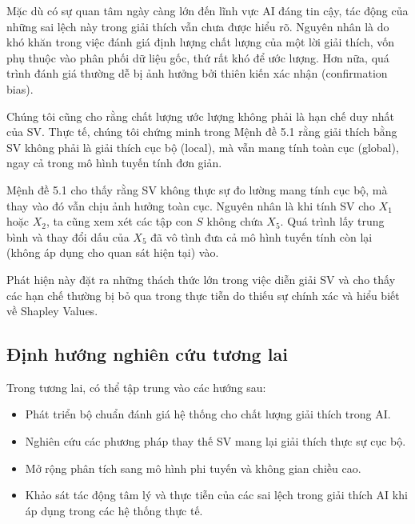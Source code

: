 \documentclass[12pt, a4paper]{article}
\begin{document}
Mặc dù có sự quan tâm ngày càng lớn đến lĩnh vực AI đáng tin cậy, tác động của những sai lệch này trong giải thích vẫn chưa được hiểu rõ. Nguyên nhân là do khó khăn trong việc đánh giá định lượng chất lượng của một lời giải thích, vốn phụ thuộc vào phân phối dữ liệu gốc, thứ rất khó để ước lượng. Hơn nữa, quá trình đánh giá thường dễ bị ảnh hưởng bởi thiên kiến xác nhận (confirmation bias).

Chúng tôi cũng cho rằng chất lượng ước lượng không phải là hạn chế duy nhất của SV. Thực tế, chúng tôi chứng minh trong Mệnh đề 5.1 rằng giải thích bằng SV không phải là giải thích cục bộ (local), mà vẫn mang tính toàn cục (global), ngay cả trong mô hình tuyến tính đơn giản.

Mệnh đề 5.1 cho thấy rằng SV không thực sự đo lường mang tính cục bộ, mà thay vào đó vẫn chịu ảnh hưởng toàn cục. Nguyên nhân là khi tính SV cho $X_1$ hoặc $X_2$, ta cũng xem xét các tập con $S$ không chứa $X_5$. Quá trình lấy trung bình và thay đổi dấu của $X_5$ đã vô tình đưa cả mô hình tuyến tính còn lại (không áp dụng cho quan sát hiện tại) vào. 

Phát hiện này đặt ra những thách thức lớn trong việc diễn giải SV và cho thấy các hạn chế thường bị bỏ qua trong thực tiễn do thiếu sự chính xác và hiểu biết về Shapley Values.

\subsection{Định hướng nghiên cứu tương lai}

Trong tương lai, có thể tập trung vào các hướng sau:
\begin{itemize}
    \item Phát triển bộ chuẩn đánh giá hệ thống cho chất lượng giải thích trong AI. 
    \item Nghiên cứu các phương pháp thay thế SV mang lại giải thích thực sự cục bộ. 
    \item Mở rộng phân tích sang mô hình phi tuyến và không gian chiều cao. 
    \item Khảo sát tác động tâm lý và thực tiễn của các sai lệch trong giải thích AI khi áp dụng trong các hệ thống thực tế. 
\end{itemize}
\end{document}
